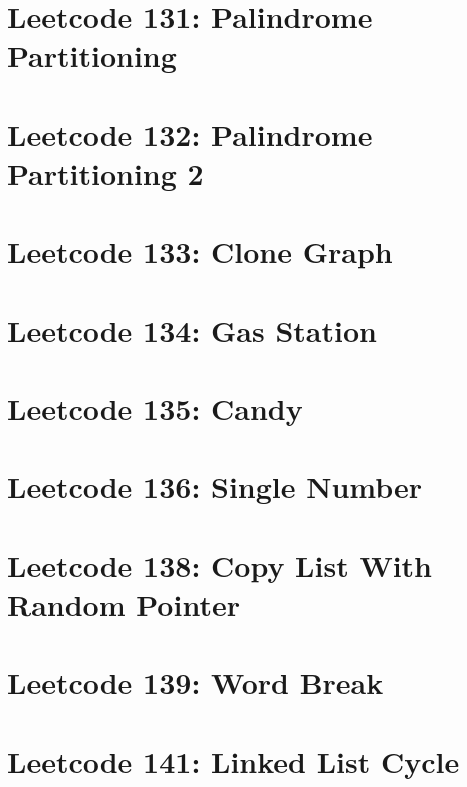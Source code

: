 \documentclass{article}
\begin{document}
\section*{Leetcode 131: Palindrome Partitioning}

\pagebreak 

\section*{Leetcode 132: Palindrome Partitioning 2}

\pagebreak 

\section*{Leetcode 133: Clone Graph}

\pagebreak 

\section*{Leetcode 134: Gas Station}

\pagebreak 

\section*{Leetcode 135: Candy}

\pagebreak 

\section*{Leetcode 136: Single Number}

\pagebreak 

\section*{Leetcode 138: Copy List With Random Pointer}

\pagebreak 

\section*{Leetcode 139: Word Break}

\pagebreak 

\section*{Leetcode 141: Linked List Cycle}

\pagebreak 
\end{document}
